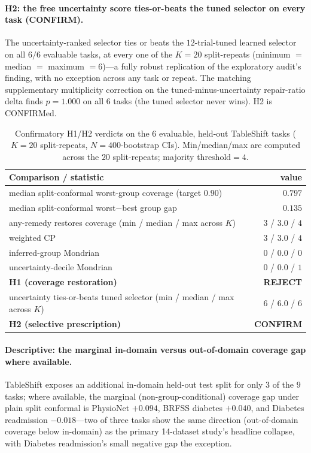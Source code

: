 \documentclass[pdflatex,sn-mathphys-num]{sn-jnl}
\begin{document}
\paragraph{H2: the free uncertainty score ties-or-beats the tuned selector on every task (CONFIRM).} The
uncertainty-ranked selector ties or beats the $12$-trial-tuned learned selector on all $6/6$ evaluable
tasks, at every one of the $K{=}20$ split-repeats (minimum $=$ median $=$ maximum $=6$)---a fully robust
replication of the exploratory audit's finding, with no exception across any task or repeat. The matching
supplementary multiplicity correction on the tuned-minus-uncertainty repair-ratio delta finds $p=1.000$ on
all $6$ tasks (the tuned selector never wins). H2 is CONFIRMed.

\begin{table}[htbp]\centering\small
\caption{Confirmatory H1/H2 verdicts on the $6$ evaluable, held-out TableShift tasks ($K{=}20$ split-repeats,
$N{=}400$-bootstrap CIs). Min/median/max are computed across the $20$ split-repeats; majority
threshold$=4$.}\label{tab:p5verdict}
\begin{tabular}{lr}
\toprule
Comparison / statistic & value \\
\midrule
median split-conformal worst-group coverage (target $0.90$) & $0.797$ \\
median split-conformal worst$-$best group gap & $0.135$ \\
any-remedy restores coverage (min / median / max across $K$) & $3$ / $3.0$ / $4$ \\
\quad weighted CP & $3$ / $3.0$ / $4$ \\
\quad inferred-group Mondrian & $0$ / $0.0$ / $0$ \\
\quad uncertainty-decile Mondrian & $0$ / $0.0$ / $1$ \\
\textbf{H1 (coverage restoration)} & \textbf{REJECT} \\
uncertainty ties-or-beats tuned selector (min / median / max across $K$) & $6$ / $6.0$ / $6$ \\
\textbf{H2 (selective prescription)} & \textbf{CONFIRM} \\
\bottomrule
\end{tabular}
\end{table}

\paragraph{Descriptive: the marginal in-domain versus out-of-domain coverage gap where available.} TableShift exposes an
additional in-domain held-out test split for only $3$ of the $9$ tasks; where available, the
marginal (non-group-conditional) coverage gap under plain split conformal is PhysioNet $+0.094$,
BRFSS diabetes $+0.040$, and Diabetes readmission $-0.018$---two of three tasks show the
same direction (out-of-domain coverage below in-domain) as the primary 14-dataset study's headline collapse,
with Diabetes readmission's small negative gap the exception.
\end{document}
